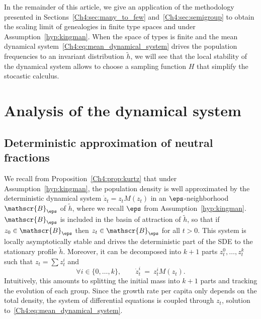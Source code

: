\begin{refsegment}

In the remainder of this article, we give an application of the methodology presented in Sections~\ref{Ch4:sec:many_to_few} and~\ref{Ch4:sec:semigroup} to obtain the scaling limit of genealogies in finite type spaces and under Assumption~\ref{hyp:kingman}.
When the space of types is finite and the mean dynamical system~\eqref{Ch4:eq:mean_dynamical_system}
drives the population frequencies to an invariant distribution $\tilde{h}$, we will see that the local stability of the dynamical system allows to choose a sampling function $H$ that simplify the stocastic calculus.
\section{Analysis of the dynamical system}\label{Ch4:sec:katz}
\subsection{Deterministic approximation of neutral fractions}


We recall from Proposition~\ref{Ch4:prop:kurtz} that under Assumption~\ref{hyp:kingman}, the population density is well approximated by the deterministic dynamical system $\dot{z}_t = z_t M(z_t)$ in an $\eps$-neighborhood $\mathscr{B}_{\eps}$ of $\tilde h$, where we recall $\eps$ from Assumption~\ref{hyp:kingman}. $\mathscr{B}_{\eps}$ is included in the basin of attraction of $\tilde h$, so that if $z_0\in \mathscr{B}_{\eps}$ then $z_t\in \mathscr{B}_\eps$ for all $t>0$. This system is locally asymptotically stable and drives the deterministic part of the SDE to the stationary profile $\tilde h$.
Moreover, it can be decomposed into $k+1$ parts $z^0_t,\ldots, z^k_t$ such that $z_t=\sum z_t^i$ and
\[
\forall i\in \{0, \ldots, k\},\qquad \dot{z}^i_t \ =\ z^i_t M(z_t).
\]
Intuitively, this amounts to splitting the initial mass into $k+1$ parts and tracking the evolution of each group. Since the growth rate per capita only depends on the total density, the system of differential equations is coupled through $z_t$, solution to~\eqref{Ch4:eq:mean_dynamical_system}.


\end{refsegment}
